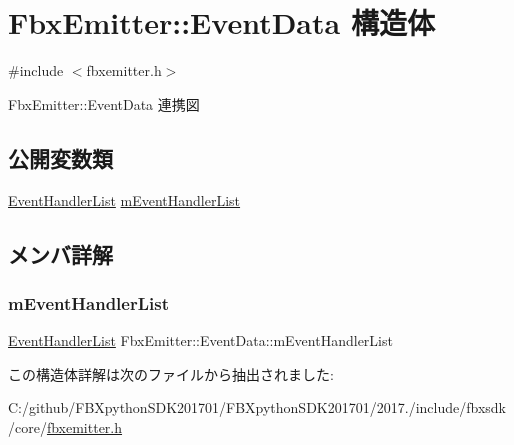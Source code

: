 \hypertarget{struct_fbx_emitter_1_1_event_data}{}\section{Fbx\+Emitter\+:\+:Event\+Data 構造体}
\label{struct_fbx_emitter_1_1_event_data}


{\ttfamily \#include $<$fbxemitter.\+h$>$}



Fbx\+Emitter\+:\+:Event\+Data 連携図
\subsection*{公開変数類}
\begin{DoxyCompactItemize}
\item 
\hyperlink{class_fbx_emitter_a9ac3cddf1a246e71957e4b7db6c08fc1}{Event\+Handler\+List} \hyperlink{struct_fbx_emitter_1_1_event_data_a0879b804afdfba87bbd758d5c78b7577}{m\+Event\+Handler\+List}
\end{DoxyCompactItemize}


\subsection{メンバ詳解}
\mbox{\label{struct_fbx_emitter_1_1_event_data_a0879b804afdfba87bbd758d5c78b7577}} 
\subsubsection{\texorpdfstring{m\+Event\+Handler\+List}{mEventHandlerList}}
{\footnotesize\ttfamily \hyperlink{class_fbx_emitter_a9ac3cddf1a246e71957e4b7db6c08fc1}{Event\+Handler\+List} Fbx\+Emitter\+::\+Event\+Data\+::m\+Event\+Handler\+List}



この構造体詳解は次のファイルから抽出されました\+:\begin{DoxyCompactItemize}
\item 
C\+:/github/\+F\+B\+Xpython\+S\+D\+K201701/\+F\+B\+Xpython\+S\+D\+K201701/2017./include/fbxsdk/core/\hyperlink{fbxemitter_8h}{fbxemitter.\+h}\end{DoxyCompactItemize}
